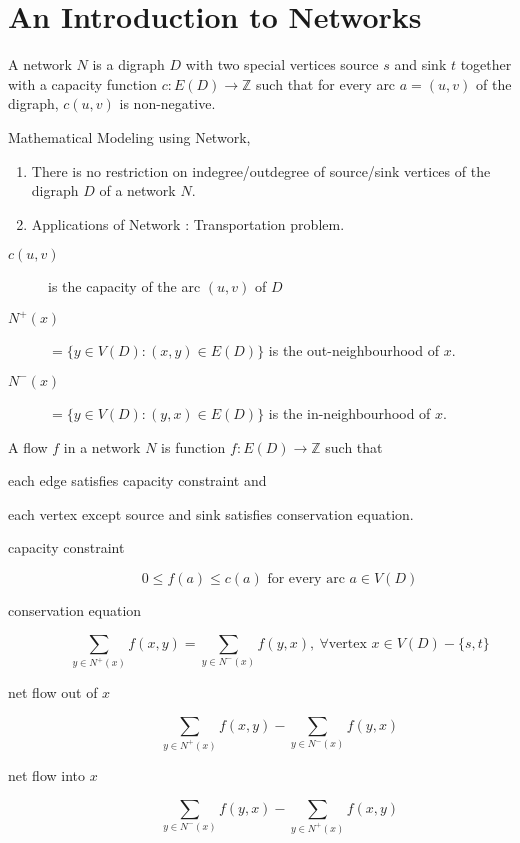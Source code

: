 \section{An Introduction to Networks}
\begin{definition}
	A network $N$ is a digraph $D$ with two special vertices source $s$ and sink $t$ together with a capacity function $c : E(D) \to \mathbb{Z}$ such that for every arc $a = (u,v)$ of the digraph, $c(u,v)$ is non-negative.
\end{definition}
\begin{remark} Mathematical Modeling using Network,
	\begin{enumerate}
		\item There is no restriction on indegree/outdegree of source/sink vertices of the digraph $D$ of a network $N$.
		\item Applications of Network : Transportation problem.
	\end{enumerate}
\end{remark}
\begin{description}
	\item[$c(u,v)$] is the capacity of the arc $(u,v)$ of $D$
	\item[$N^+(x)$] $= \{ y \in V(D) : (x,y) \in E(D)\}$ is the out-neighbourhood of $x$.
	\item[$N^-(x)$] $= \{ y \in V(D) : (y,x) \in E(D)\}$ is the in-neighbourhood of $x$.
\end{description}
\begin{definition}
	A flow $f$ in a network $N$ is function $f : E(D) \to \mathbb{Z}$ such that
	\begin{enumerate*}
		\item each edge satisfies capacity constraint and
		\item each vertex except source and sink satisfies conservation equation.
	\end{enumerate*}
\end{definition}
\begin{description}
	\item[capacity constraint] 
		\begin{equation}
		0 \le f(a) \le c(a) \text{ for every arc }a \in V(D)
		\end{equation}
	\item[conservation equation] 
		\begin{equation}
			\sum_{y \in N^+(x)} f(x,y) = \sum_{y \in N^-(x)} f(y,x),\ \forall \text{vertex } x \in V(D)-\{s,t\}
		\label{equ:conservation}
		\end{equation}
	\item[net flow out of $x$] $$\sum_{y \in N^+(x)} f(x,y) - \sum_{y \in N^-(x)} f(y,x)$$
	\item[net flow into $x$] $$\sum_{y \in N^-(x)} f(y,x) - \sum_{y \in N^+(x)} f(x,y)$$
\end{description}
